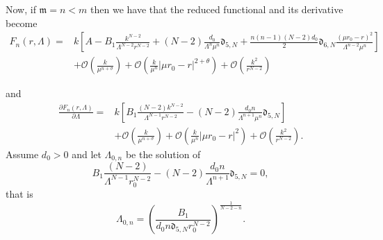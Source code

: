 \documentclass[11pt,a4paper]{amsart}
\begin{document}
Now, if  $\mathfrak m=n<m$ then we have that the reduced functional and its derivative become
$$\begin{aligned} F_n(r, \Lambda)=&k\left[A-B_1\frac{k^{N-2}}{\Lambda^{N-2}r^{N-2}}+(N-2)\frac{d_0}{\Lambda^n \mu^n}\mathfrak d_{5, N}+\frac{n(n-1)(N-2)d_0}{2}\mathfrak d_{6, N}\frac{(\mu r_0-r)^2}{\Lambda^{n-2}\mu^n}\right]\\
&+\mathcal O\left(\frac{k}{\mu^{n+\sigma}}\right)  +\mathcal O\left(\frac{k}{\mu^{n}}|\mu r_0-r|^{2+\theta}\right)+\mathcal O\left(\frac{k^2}{r^{N-2}}\right)
\end{aligned}$$

and
$$\begin{aligned} \frac{\partial F_n(r, \Lambda)}{\partial\Lambda}=&k\left[B_1\frac{(N-2)k^{N-2}}{\Lambda^{N-1}r^{N-2}}-(N-2)\frac{d_0 n}{\Lambda^{n+1} \mu^n}\mathfrak d_{5, N}\right]\\
&+\mathcal O\left(\frac{k}{\mu^{n+\sigma}}\right)  +\mathcal O\left(\frac{k}{\mu^{n}}|\mu r_0-r|^{2}\right)+\mathcal O\left(\frac{k^2}{r^{N-2}}\right).
\end{aligned}$$
Assume $d_0>0$ and  let $\Lambda_{0, n}$ be the solution of
\[
B_1\frac{(N-2)}{\Lambda^{N-1}r^{N-2}_0}-(N-2)\frac{d_0 n}{\Lambda^{n+1} }\mathfrak d_{5, N}=0,
\]
that is
\[
\Lambda_{0, n}=\left(\frac{B_1}{d_0n \mathfrak d_{5, N}r_{0}^{N-2}}\right)^{\frac{1}{N-2-n}}.
\]
\end{document}
